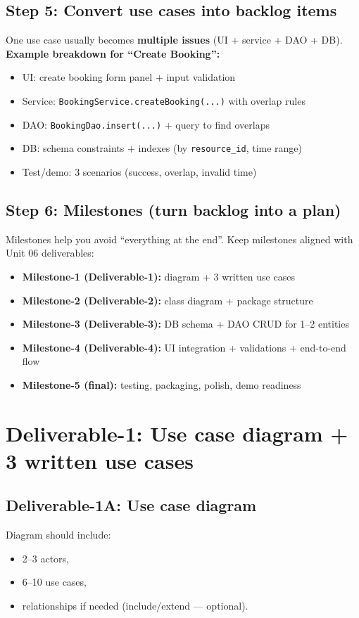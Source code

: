 \documentclass[11pt]{article}
\begin{document}
\subsection{Step 5: Convert use cases into backlog items}
One use case usually becomes \textbf{multiple issues} (UI + service + DAO + DB).
\textbf{Example breakdown for ``Create Booking'':}
\begin{itemize}
  \item UI: create booking form panel + input validation
  \item Service: \texttt{BookingService.createBooking(...)} with overlap rules
  \item DAO: \texttt{BookingDao.insert(...)} + query to find overlaps
  \item DB: schema constraints + indexes (by \texttt{resource\_id}, time range)
  \item Test/demo: 3 scenarios (success, overlap, invalid time)
\end{itemize}

\subsection{Step 6: Milestones (turn backlog into a plan)}
Milestones help you avoid ``everything at the end''.
Keep milestones aligned with Unit 06 deliverables:
\begin{itemize}
  \item \textbf{Milestone-1 (Deliverable-1):} diagram + 3 written use cases
  \item \textbf{Milestone-2 (Deliverable-2):} class diagram + package structure
  \item \textbf{Milestone-3 (Deliverable-3):} DB schema + DAO CRUD for 1--2 entities
  \item \textbf{Milestone-4 (Deliverable-4):} UI integration + validations + end-to-end flow
  \item \textbf{Milestone-5 (final):} testing, packaging, polish, demo readiness
\end{itemize}
\notesources{\OOPSUnitVISources}

\section{Deliverable-1: Use case diagram + 3 written use cases}
\subsection*{Deliverable-1A: Use case diagram}
Diagram should include:
\begin{itemize}
  \item 2--3 actors,
  \item 6--10 use cases,
  \item relationships if needed (include/extend --- optional).
\end{itemize}
\end{document}
